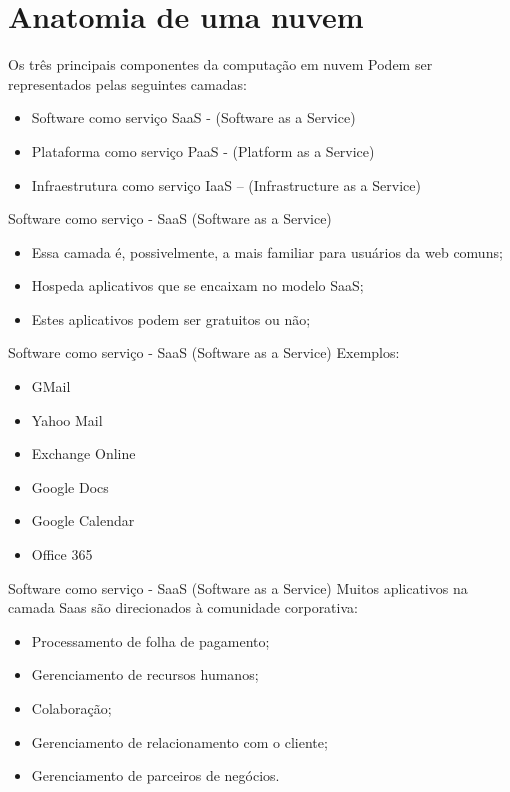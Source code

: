 \documentclass{beamer}
\begin{document}
\section{Anatomia de uma nuvem}
\begin{frame}[fragile]{Os três principais componentes da computação em nuvem}\justifying
      Podem ser representados pelas seguintes camadas:
      \begin{itemize}
            \item Software como serviço SaaS - (Software as a Service)
            \item Plataforma como serviço PaaS - (Platform as a Service)
            \item Infraestrutura como serviço IaaS – (Infrastructure as a Service)
      \end{itemize}
\end{frame}
\begin{frame}[fragile]{Software como serviço - SaaS (Software as a Service)}\justifying
      \begin{itemize}
            \item Essa camada é, possivelmente, a mais familiar para usuários da web comuns;
            \item Hospeda aplicativos que se encaixam no modelo SaaS;
            \item Estes aplicativos podem ser gratuitos ou não;
      \end{itemize}
\end{frame}
\begin{frame}[fragile]{Software como serviço - SaaS (Software as a Service)}\justifying
      Exemplos:
      \begin{itemize}
            \item GMail
            \item Yahoo Mail
            \item Exchange Online
            \item Google Docs
            \item Google Calendar
            \item Office 365
      \end{itemize}
\end{frame}
\begin{frame}[fragile]{Software como serviço - SaaS (Software as a Service)}\justifying
      Muitos aplicativos na camada Saas são direcionados à comunidade corporativa:
      \begin{itemize}
            \item Processamento de folha de pagamento;
            \item Gerenciamento de recursos humanos;
            \item Colaboração;
            \item Gerenciamento de relacionamento com o cliente;
            \item Gerenciamento de parceiros de negócios.
      \end{itemize}
\end{frame}
\end{document}
